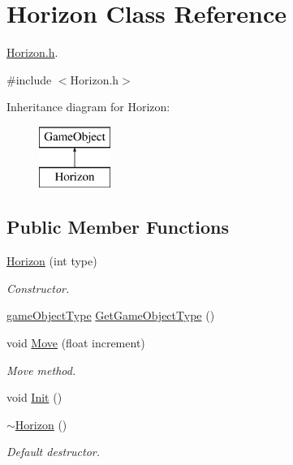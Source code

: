 \hypertarget{class_horizon}{}\section{Horizon Class Reference}
\label{class_horizon}


\mbox{\hyperlink{_horizon_8h}{Horizon.\+h}}.  




{\ttfamily \#include $<$Horizon.\+h$>$}

Inheritance diagram for Horizon\+:\begin{figure}[H]
\begin{center}
\leavevmode
\includegraphics[height=2.000000cm]{class_horizon}
\end{center}
\end{figure}
\subsection*{Public Member Functions}
\begin{DoxyCompactItemize}
\item 
\mbox{\hyperlink{class_horizon_adbdceabfe68477247ecb2c469e4d8187}{Horizon}} (int type)
\begin{DoxyCompactList}\small\item\em Constructor. \end{DoxyCompactList}\item 
\mbox{\hyperlink{class_game_object_ad5092169e581fb0772e01026882ea0c8}{game\+Object\+Type}} \mbox{\hyperlink{class_horizon_abe319d6ba70ce79028ba9175a4bcd4e6}{Get\+Game\+Object\+Type}} ()
\item 
void \mbox{\hyperlink{class_horizon_a845596ecfc2953f0d124e5fd0d7cb1d3}{Move}} (float increment)
\begin{DoxyCompactList}\small\item\em Move method. \end{DoxyCompactList}\item 
void \mbox{\hyperlink{class_horizon_a80800c898ea4cd015ae865351a6aec4c}{Init}} ()
\item 
\mbox{\hyperlink{class_horizon_a4b917eb3365308d9ab6e1ab5c8891299}{$\sim$\+Horizon}} ()
\begin{DoxyCompactList}\small\item\em Default destructor. \end{DoxyCompactList}\end{DoxyCompactItemize}
